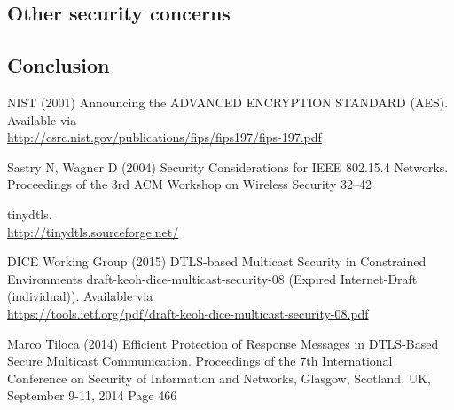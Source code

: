 \subsection{Other security concerns}

\subsection{Conclusion}

\begin{thebibliography}{99.}
 NIST (2001) Announcing the ADVANCED ENCRYPTION STANDARD (AES). Available via\\
\url{http://csrc.nist.gov/publications/fips/fips197/fips-197.pdf}

 Sastry N, Wagner D (2004) Security Considerations for IEEE 802.15.4 Networks. Proceedings of the 3rd ACM Workshop on Wireless Security 32--42

 tinydtls. \\ 
\url{http://tinydtls.sourceforge.net/}

 DICE Working Group (2015) DTLS-based Multicast Security in Constrained Environments
 draft-keoh-dice-multicast-security-08 (Expired Internet-Draft (individual)). Available via\\
\url{https://tools.ietf.org/pdf/draft-keoh-dice-multicast-security-08.pdf}

 Marco Tiloca (2014) Efficient Protection of Response Messages in DTLS-Based Secure Multicast Communication. Proceedings of the 7th International Conference on Security of Information and Networks, Glasgow, Scotland, UK, September 9-11, 2014 Page 466
\end{thebibliography}